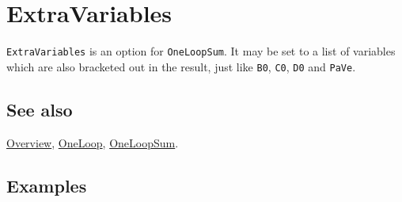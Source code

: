 \documentclass[../FeynCalcManual.tex]{subfiles}
\begin{document}
\hypertarget{extravariables}{
\section{ExtraVariables}\label{extravariables}}

\texttt{ExtraVariables} is an option for \texttt{OneLoopSum}. It may be
set to a list of variables which are also bracketed out in the result,
just like \texttt{B0}, \texttt{C0}, \texttt{D0} and \texttt{PaVe}.

\subsection{See also}

\hyperlink{toc}{Overview}, \hyperlink{oneloop}{OneLoop},
\hyperlink{oneloopsum}{OneLoopSum}.

\subsection{Examples}
\end{document}
